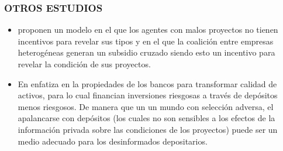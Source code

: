 \begin{frame}
    \frametitle{{\normalsize OTROS ESTUDIOS} {}}
    \begin{itemize}
        \item \cite{Prescott1986} proponen un modelo en el que los agentes con malos proyectos no tienen incentivos para revelar sus tipos y en el que la coalición entre empresas heterogéneas generan un subsidio cruzado siendo esto un incentivo para revelar la condición de sus proyectos. 
        \item En \cite{Gorton1990} enfatiza en la propiedades de los bancos para transformar calidad de activos, para lo cual financian inversiones riesgosas a través de depósitos menos riesgosos. De manera que un un mundo con selección adversa, el apalancarse con depósitos (los cuales no son sensibles a los efectos de la información privada sobre las condiciones de los proyectos) puede ser un medio adecuado para los desinformados depositarios.
    \end{itemize}
    
\end{frame}

